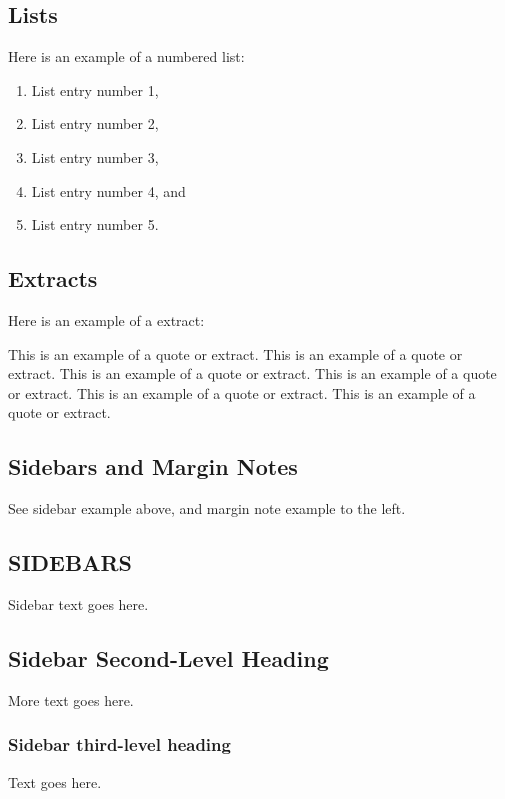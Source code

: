 \documentclass{ar-1col}
\begin{document}
\subsection{Lists} Here is an example of a numbered list:
\begin{enumerate}
\item List entry number 1,
\item List entry number 2,
\item List entry number 3,\item List entry number 4, and
\item List entry number 5.
\end{enumerate}

\subsection{Extracts}
\noindent Here is an example of a extract:
\begin{extract}
This is an example of a quote or extract.
This is an example of a quote or extract. This is an example of a quote or extract.
This is an example of a quote or extract. This is an example of a quote or extract.
This is an example of a quote or extract. 



\end{extract}

\subsection{Sidebars and Margin Notes}
See sidebar example above, and margin note example to the left.
\begin{marginnote}[]
\end{marginnote}

\begin{textbox}[]\section{SIDEBARS}
Sidebar text goes here.
\subsection{Sidebar Second-Level Heading}
More text goes here.\subsubsection{Sidebar third-level heading}
Text goes here.\end{textbox}
\end{document}

